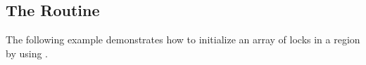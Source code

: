 \subsection{The  Routine}
\label{subsec:init_lock}

The following example demonstrates how to initialize an array of locks in a  
region by using .



